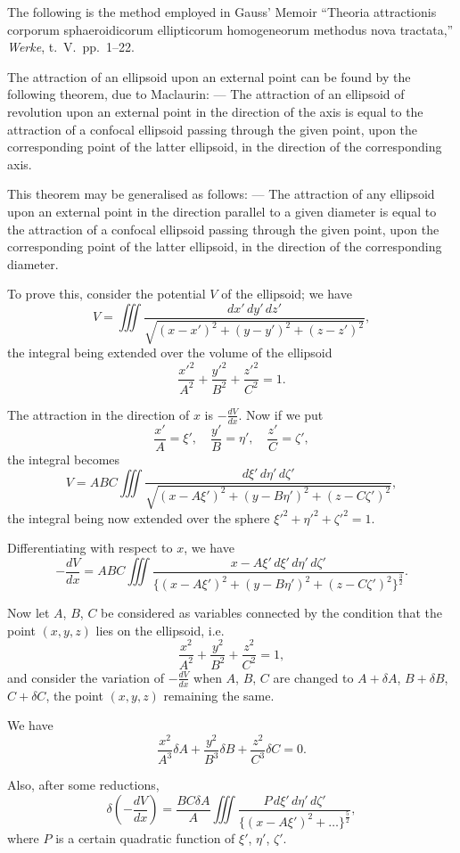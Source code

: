 \documentclass[11pt,a4paper]{book}
\begin{document}
The following is the method employed in Gauss' Memoir ``Theoria attractionis corporum sphaeroidicorum ellipticorum homogeneorum methodus nova tractata,'' \textit{Werke}, t.~V.\ pp.~1--22.

The attraction of an ellipsoid upon an external point can be found by the following theorem, due to Maclaurin: --- The attraction of an ellipsoid of revolution upon an external point in the direction of the axis is equal to the attraction of a confocal ellipsoid passing through the given point, upon the corresponding point of the latter ellipsoid, in the direction of the corresponding axis.

This theorem may be generalised as follows: --- The attraction of any ellipsoid upon an external point in the direction parallel to a given diameter is equal to the attraction of a confocal ellipsoid passing through the given point, upon the corresponding point of the latter ellipsoid, in the direction of the corresponding diameter.

To prove this, consider the potential $V$ of the ellipsoid; we have
\[
V = \iiint \frac{dx'\, dy'\, dz'}{\sqrt{(x-x')^2 + (y-y')^2 + (z-z')^2}},
\]
the integral being extended over the volume of the ellipsoid
\[
\frac{x'^2}{A^2} + \frac{y'^2}{B^2} + \frac{z'^2}{C^2} = 1.
\]

The attraction in the direction of $x$ is $-\frac{dV}{dx}$. Now if we put
\[
\frac{x'}{A} = \xi', \quad \frac{y'}{B} = \eta', \quad \frac{z'}{C} = \zeta',
\]
the integral becomes
\[
V = ABC \iiint \frac{d\xi'\, d\eta'\, d\zeta'}{\sqrt{(x-A\xi')^2 + (y-B\eta')^2 + (z-C\zeta')^2}},
\]
the integral being now extended over the sphere $\xi'^2 + \eta'^2 + \zeta'^2 = 1$.

Differentiating with respect to $x$, we have
\[
-\frac{dV}{dx} = ABC \iiint \frac{x-A\xi'\, d\xi'\, d\eta'\, d\zeta'}{\{(x-A\xi')^2 + (y-B\eta')^2 + (z-C\zeta')^2\}^{\frac{3}{2}}}.
\]

Now let $A$, $B$, $C$ be considered as variables connected by the condition that the point $(x,y,z)$ lies on the ellipsoid, i.e.
\[
\frac{x^2}{A^2} + \frac{y^2}{B^2} + \frac{z^2}{C^2} = 1,
\]
and consider the variation of $-\frac{dV}{dx}$ when $A$, $B$, $C$ are changed to $A+\delta A$, $B+\delta B$, $C+\delta C$, the point $(x,y,z)$ remaining the same.

We have
\[
\frac{x^2}{A^3}\delta A + \frac{y^2}{B^3}\delta B + \frac{z^2}{C^3}\delta C = 0.
\]

Also, after some reductions,
\[
\delta\left(-\frac{dV}{dx}\right) = \frac{BC\delta A}{A} \iiint \frac{P\, d\xi'\, d\eta'\, d\zeta'}{\{(x-A\xi')^2 + \ldots\}^{\frac{5}{2}}},
\]
where $P$ is a certain quadratic function of $\xi'$, $\eta'$, $\zeta'$.
\end{document}
